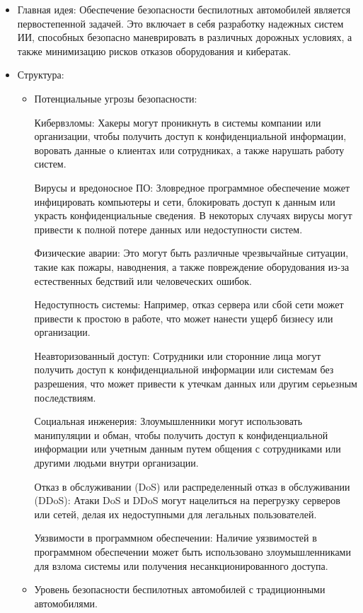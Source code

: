 \documentclass{article}
\begin{document}
\begin{itemize}
    \item Главная идея: Обеспечение безопасности беспилотных автомобилей является первостепенной задачей. Это включает в себя разработку надежных систем ИИ, способных безопасно маневрировать в различных дорожных условиях, а также минимизацию рисков отказов оборудования и кибератак.
    
    \item Структура:
    \begin{itemize}
        \item Потенциальные угрозы безопасности:
        
        Кибервзломы: Хакеры могут проникнуть в системы компании или организации, чтобы получить доступ к конфиденциальной информации, воровать данные о клиентах или сотрудниках, а также нарушать работу систем.

        Вирусы и вредоносное ПО: Зловредное программное обеспечение может инфицировать компьютеры и сети, блокировать доступ к данным или украсть конфиденциальные сведения. В некоторых случаях вирусы могут привести к полной потере данных или недоступности систем.

        Физические аварии: Это могут быть различные чрезвычайные ситуации, такие как пожары, наводнения, а также повреждение оборудования из-за естественных бедствий или человеческих ошибок.

        Недоступность системы: Например, отказ сервера или сбой сети может привести к простою в работе, что может нанести ущерб бизнесу или организации.

        Неавторизованный доступ: Сотрудники или сторонние лица могут получить доступ к конфиденциальной информации или системам без разрешения, что может привести к утечкам данных или другим серьезным последствиям.

        Социальная инженерия: Злоумышленники могут использовать манипуляции и обман, чтобы получить доступ к конфиденциальной информации или учетным данным путем общения с сотрудниками или другими людьми внутри организации.

        Отказ в обслуживании (DoS) или распределенный отказ в обслуживании (DDoS): Атаки DoS и DDoS могут нацелиться на перегрузку серверов или сетей, делая их недоступными для легальных пользователей.

        Уязвимости в программном обеспечении: Наличие уязвимостей в программном обеспечении может быть использовано злоумышленниками для взлома системы или получения несанкционированного доступа.
        \item Уровень безопасности беспилотных автомобилей с традиционными автомобилями.


\end{itemize}
\end{itemize}
\end{document}
